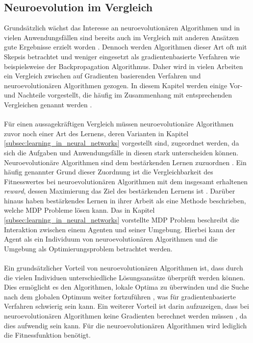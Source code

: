 \subsection{Neuroevolution im Vergleich}
\label{subsec:comparision_neuroevoltion}
Grundsätzlich wächst das Interesse an neuroevolutionären Algorithmen und in vielen Anwendungsfällen sind bereits auch im Vergleich mit anderen Ansätzen gute Ergebnisse erzielt worden \cite{meisner2009neurostrategies}. Dennoch werden Algorithmen dieser Art oft mit Skepsis betrachtet und weniger eingesetzt als gradientenbasierte Verfahren wie beispielsweise der Backpropagation Algorithmus. Daher wird in vielen Arbeiten ein Vergleich zwischen auf Gradienten basierenden Verfahren und neuroevolutionären Algorithmen gezogen. In diesem Kapitel werden einige Vor- und Nachteile vorgestellt, die häufig im Zusammenhang mit entsprechenden Vergleichen genannt werden \cite{rojas1996neural, meisner2009neurostrategies, such2017deep, whitley1993genetic}.
\\\\
Für einen aussagekräftigen Vergleich müssen neuroevolutionäre Algorithmen zuvor noch einer Art des Lernens, deren Varianten in Kapitel \ref{subsec:learning_in_neural_networks} vorgestellt sind, zugeordnet werden, da sich die Aufgaben und Anwendungsfälle in diesen stark unterscheiden können. Neuroevolutionäre Algorithmen sind dem bestärkenden Lernen zuzuordnen \cite{whitley1993genetic}. Ein häufig genannter Grund dieser Zuordnung ist die Vergleichbarkeit des Fitnesswertes bei neuroevolutionären Algorithmen mit dem insgesamt erhaltenen \emph{reward}, dessen Maximierung das Ziel des bestärkenden Lernens ist \cite{such2017deep}. Darüber hinaus haben \citeauthor{sutton2018reinforcement} bestärkendes Lernen in ihrer Arbeit als eine Methode beschrieben, welche \ac{MDP} Probleme lösen kann. Das in Kapitel \ref{subsec:learning_in_neural_networks} vorstellte \ac{MDP} Problem beschreibt die Interaktion zwischen einem Agenten und seiner Umgebung. Hierbei kann der Agent als ein Individuum von neuroevolutionären Algorithmen und die Umgebung als Optimierungsproblem betrachtet werden. 
\\\\
Ein grundsätzlicher Vorteil von neuroevolutionären Algorithmen ist, dass durch die vielen Individuen unterschiedliche Lösungsansätze überprüft werden können. Dies ermöglicht es den Algorithmen, lokale Optima zu überwinden und die Suche nach dem globalen Optimum weiter fortzuführen \cite{rojas1996neural}, was für gradientenbasierte Verfahren schwierig sein kann. Ein weiterer Vorteil ist darin aufzuzeigen, dass bei neuroevolutionären Algorithmen keine Gradienten berechnet werden müssen \cite{rojas1996neural}, da dies aufwendig sein kann. Für die neuroevolutionären Algorithmen wird lediglich die Fitnessfunktion benötigt. 
